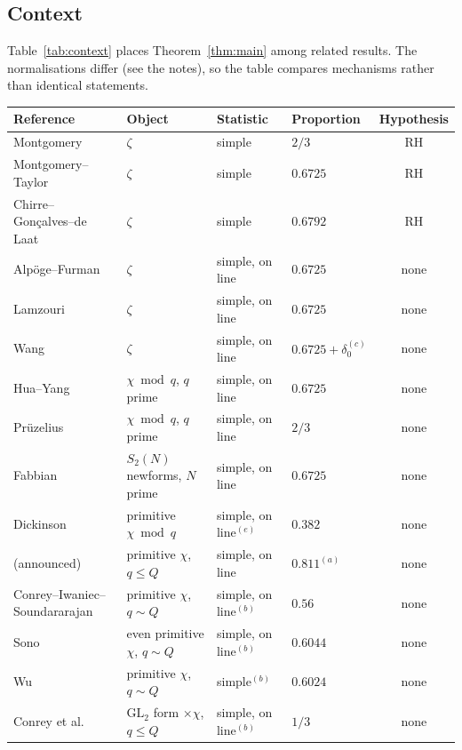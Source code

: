 \documentclass[11pt]{amsart}
\theoremstyle{definition}
\theoremstyle{remark}
\numberwithin{equation}{section}
\begin{document}
\subsection{Context}
Table~\ref{tab:context} places Theorem~\ref{thm:main} among related results. The normalisations differ (see the notes), so the table compares mechanisms rather than identical statements.

\begin{table}[ht]
\centering\footnotesize\setlength{\tabcolsep}{4pt}
\begin{tabular}{@{}llllc@{}}
\toprule
Reference & Object & Statistic & Proportion & Hypothesis\\
\midrule
Montgomery \cite{Mon73} & $\zeta$ & simple & $2/3$ & RH\\
Montgomery--Taylor \cite{Mon75} & $\zeta$ & simple & $0.6725$ & RH\\
Chirre--Gon\c calves--de Laat \cite{CGdL} & $\zeta$ & simple & $0.6792$ & RH\\
Alp\"oge--Furman \cite{AF26} & $\zeta$ & simple, on line & $0.6725$ & none\\
Lamzouri \cite{Lam26} & $\zeta$ & simple, on line & $0.6725$ & none\\
Wang \cite{Wang26} & $\zeta$ & simple, on line & $0.6725+\delta_0^{(c)}$ & none\\
Hua--Yang \cite{HY26,HY26b} & $\chi\bmod q$, $q$ prime & simple, on line & $0.6725$ & none\\
Pr\"uzelius \cite{Pru26} & $\chi\bmod q$, $q$ prime & simple, on line & $2/3$ & none\\
Fabbian \cite{Fab26} & $S_2(N)$ newforms, $N$ prime & simple, on line & $0.6725$ & none\\
Dickinson \cite{Dic24} & primitive $\chi\bmod q$ & simple, on line$^{(e)}$ & $0.382$ & none\\
\cite[Rem.~7.2]{AF26} (announced) & primitive $\chi$, $q\le Q$ & simple, on line & $0.811^{(a)}$ & none\\
Conrey--Iwaniec--Soundararajan \cite{CIS13} & primitive $\chi$, $q\sim Q$ & simple, on line$^{(b)}$ & $0.56$ & none\\
Sono \cite{Sono25} & even primitive $\chi$, $q\sim Q$ & simple, on line$^{(b)}$ & $0.6044$ & none\\
Wu \cite{Wu16} & primitive $\chi$, $q\sim Q$ & simple$^{(b)}$ & $0.6024$ & none\\
Conrey et al.\ \cite{CKLT26} & $\mathrm{GL}_2$ form $\times\chi$, $q\le Q$ & simple, on line$^{(b)}$ & $1/3$ & none\\

\end{tabular}
\end{table}
\end{document}
